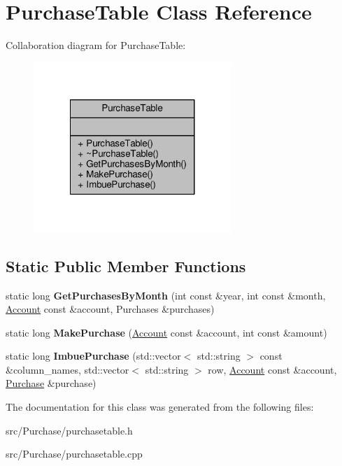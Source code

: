 \hypertarget{classPurchaseTable}{\section{Purchase\-Table Class Reference}
\label{classPurchaseTable}
}


Collaboration diagram for Purchase\-Table\-:
\nopagebreak
\begin{figure}[H]
\begin{center}
\leavevmode
\includegraphics[width=212pt]{classPurchaseTable__coll__graph}
\end{center}
\end{figure}
\subsection*{Static Public Member Functions}
\begin{DoxyCompactItemize}
\item 
\hypertarget{classPurchaseTable_aba70ece26949ff6a10fb5f99268da681}{static long {\bfseries Get\-Purchases\-By\-Month} (int const \&year, int const \&month, \hyperlink{classAccount}{Account} const \&account, Purchases \&purchases)}\label{classPurchaseTable_aba70ece26949ff6a10fb5f99268da681}

\item 
\hypertarget{classPurchaseTable_a431e9fc9e6b017be67adc19e0dcb0eb2}{static long {\bfseries Make\-Purchase} (\hyperlink{classAccount}{Account} const \&account, int const \&amount)}\label{classPurchaseTable_a431e9fc9e6b017be67adc19e0dcb0eb2}

\item 
\hypertarget{classPurchaseTable_aca8b752313fbbf0a6143246f598078df}{static long {\bfseries Imbue\-Purchase} (std\-::vector$<$ std\-::string $>$ const \&column\-\_\-names, std\-::vector$<$ std\-::string $>$ row, \hyperlink{classAccount}{Account} const \&account, \hyperlink{classPurchase}{Purchase} \&purchase)}\label{classPurchaseTable_aca8b752313fbbf0a6143246f598078df}

\end{DoxyCompactItemize}


The documentation for this class was generated from the following files\-:\begin{DoxyCompactItemize}
\item 
src/\-Purchase/purchasetable.\-h\item 
src/\-Purchase/purchasetable.\-cpp\end{DoxyCompactItemize}
